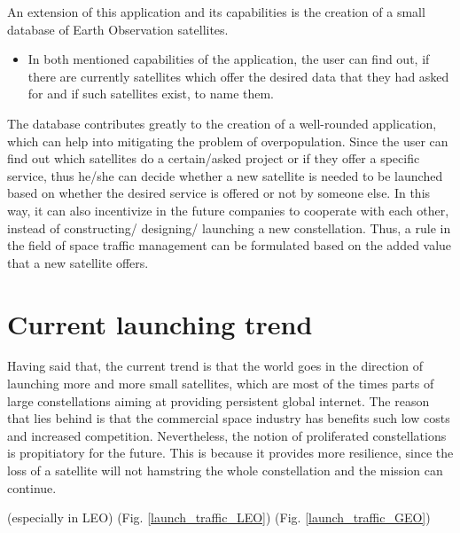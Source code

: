 An extension of this application and its capabilities is the creation of a small database of Earth Observation satellites.

\begin{itemize}
\item In both mentioned capabilities of the application, the user can find out, if there are currently satellites which offer the desired data that they had asked for and if such satellites exist, to name them.
\end{itemize}

The database contributes greatly to the creation of a well-rounded application, which can help into mitigating the problem of overpopulation. Since the user can find out which satellites do a certain/asked project or if they offer a specific service, thus he/she can decide whether a new satellite is needed to be launched based on whether the desired service is offered or not by someone else. In this way, it can also incentivize in the future companies to cooperate with each other, instead of constructing/ designing/ launching a new constellation. Thus, a rule in the field of space traffic management can be formulated based on the added value that a new satellite offers.




\section{Current launching trend}
\bigskip


Having said that, the current trend is that the world goes in the direction of launching more and more small satellites, which are most of the times parts of large constellations aiming at providing persistent global internet. The reason that lies behind is that the commercial space industry has benefits such low costs and increased competition. Nevertheless, the notion of proliferated constellations is propitiatory for the future. This is because it provides more resilience, since the loss of a satellite will not hamstring the whole constellation and the mission can continue.

(especially in LEO)
(Fig. \ref{launch_traffic_LEO}) (Fig. \ref{launch_traffic_GEO}) 

